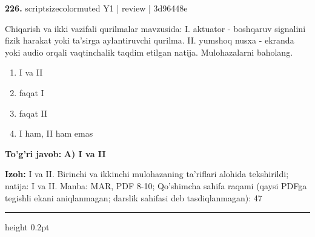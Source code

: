 \documentclass[10pt,a4paper]{article}
\begin{document}
{\bfseries\sffamily\color{ink} 226.} {scriptsizecolor{muted} Y1 | review | 3d96448e}
\par
Chiqarish va ikki vazifali qurilmalar mavzusida: I. aktuator - boshqaruv signalini fizik harakat yoki ta'sirga aylantiruvchi qurilma. II. yumshoq nusxa - ekranda yoki audio orqali vaqtinchalik taqdim etilgan natija. Mulohazalarni baholang.
\begin{enumerate}[label=\Alph*),leftmargin=9mm]
\item I va II
\item faqat I
\item faqat II
\item I ham, II ham emas
\end{enumerate}
\begin{tcolorbox}[enhanced,breakable,colback=teal!4,colframe=teal!60!black,boxrule=0.45pt,arc=1.2mm,left=2.7mm,right=2.7mm,top=1.8mm,bottom=1.8mm,before skip=2mm,after skip=2mm]
{\bfseries\sffamily\color{teal}To'g'ri javob:} \textbf{A) I va II}
\par\smallskip
{\bfseries Izoh:} I va II. Birinchi va ikkinchi mulohazaning ta'riflari alohida tekshirildi; natija: I va II. Manba: MAR, PDF 8-10; Qo'shimcha sahifa raqami (qaysi PDFga tegishli ekani aniqlanmagan; darslik sahifasi deb tasdiqlanmagan): 47
\end{tcolorbox}
\vspace{2mm}\hrule height 0.2pt\vspace{3mm}
\end{document}
